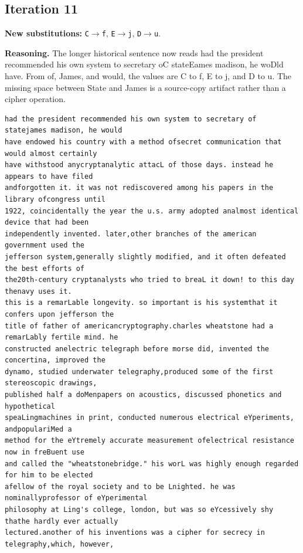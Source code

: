 \documentclass[12pt,a4paper]{article}
\begin{document}
\subsection{Iteration 11}

\noindent\textbf{New substitutions:} \texttt{C}$\rightarrow$\texttt{f}, \texttt{E}$\rightarrow$\texttt{j}, \texttt{D}$\rightarrow$\texttt{u}.\par
\smallskip
\noindent\textbf{Reasoning.} The longer historical sentence now reads had the president recommended his own system to secretary oC stateEames madison, he woDld have. From of, James, and would, the values are C to f, E to j, and D to u. The missing space between State and James is a source-copy artifact rather than a cipher operation.

\begin{lstlisting}[style=ciphertext,caption={Complete text after iteration 11}]
had the president recommended his own system to secretary of statejames madison, he would
have endowed his country with a method ofsecret communication that would almost certainly
have withstood anycryptanalytic attacL of those days. instead he appears to have filed
andforgotten it. it was not rediscovered among his papers in the library ofcongress until
1922, coincidentally the year the u.s. army adopted analmost identical device that had been
independently invented. later,other branches of the american government used the
jefferson system,generally slightly modified, and it often defeated the best efforts of
the20th-century cryptanalysts who tried to breaL it down! to this day thenavy uses it.
this is a remarLable longevity. so important is his systemthat it confers upon jefferson the
title of father of americancryptography.charles wheatstone had a remarLably fertile mind. he
constructed anelectric telegraph before morse did, invented the concertina, improved the
dynamo, studied underwater telegraphy,produced some of the first stereoscopic drawings,
published half a doMenpapers on acoustics, discussed phonetics and hypothetical
speaLingmachines in print, conducted numerous electrical eYperiments, andpopulariMed a
method for the eYtremely accurate measurement ofelectrical resistance now in freBuent use
and called the "wheatstonebridge." his worL was highly enough regarded for him to be elected
afellow of the royal society and to be Lnighted. he was nominallyprofessor of eYperimental
philosophy at Ling's college, london, but was so eYcessively shy thathe hardly ever actually
lectured.another of his inventions was a cipher for secrecy in telegraphy,which, however,

\end{lstlisting}
\end{document}
